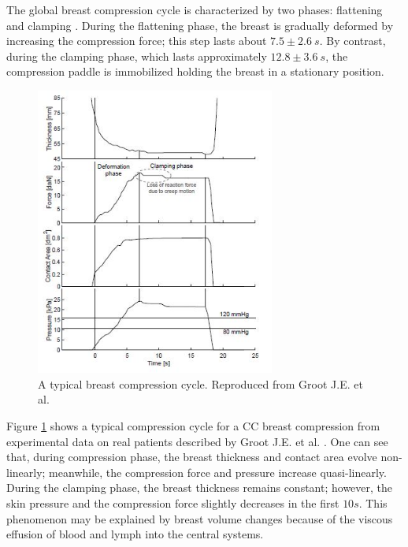 The global breast compression cycle is characterized by two phases: flattening and clamping \citep{de_pain_2015}. During the flattening phase, the breast is gradually deformed by increasing the compression force; this step lasts about  $7.5 \pm 2.6\ s$. By contrast, during the clamping phase, which lasts approximately $12.8 \pm 3.6\ s$, the compression paddle is immobilized holding the breast in a stationary position. 
\begin{figure}[!h]
\centering
\includegraphics[width=0.7\textwidth,keepaspectratio]{figures/breast_compression_cycle.jpg} 
\caption{A typical breast compression cycle. Reproduced from Groot J.E. et al. \citep{groot_towards_2015}}\label{fig:breast_compression_cycle}
\end{figure}

Figure \ref{fig:breast_compression_cycle} shows a typical compression cycle for a CC breast compression from experimental data on real patients described by Groot J.E. et al. \citep{de_pain_2015}. One can see that, during compression phase, the breast thickness and contact area evolve non-linearly; meanwhile, the compression force and pressure increase quasi-linearly. During the clamping phase, the breast thickness remains constant; however, the skin pressure and the compression force slightly decreases in the first $10s$. This phenomenon may be explained by breast volume changes because of the viscous effusion of blood and lymph into the central systems. 

